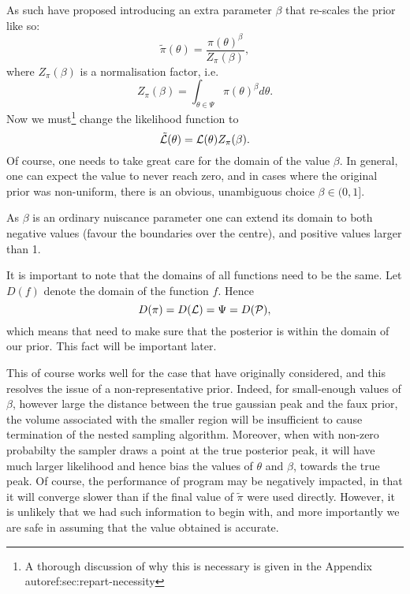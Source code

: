 \documentclass[usenatbib]{mnras}
\begin{document}
As such \citeauthor{chen-ferroz-hobson} have proposed introducing an
extra parameter \(\beta\) that re-scales the prior like so:
\begin{equation}
  \tilde{\pi}(\theta) = \frac{\pi(\theta)^{\beta}}{Z_{\pi}(\beta)},
\end{equation}
where \(Z_\pi(\beta)\) is a normalisation factor, i.e. 
\begin{equation}
  Z_{\pi}(\beta) = \int_{\theta \in \Psi} \pi(\theta)^{\beta}d\theta.
\end{equation}
Now we must\footnote{A thorough discussion of why this is necessary is given in the Appendix autoref:sec:repart-necessity} change the likelihood function to 
\begin{equation}
  \tilde{\cal L}(\theta) = {\cal L}(\theta) Z_{\pi}(\beta).
\end{equation}
Of course, one needs to take great care for the domain of the value
\(\beta\). In general, one can expect the value to never reach
zero, and in cases where the original prior was non-uniform, there
is an obvious, unambiguous choice \(\beta \in (0, 1]\). 

As \(\beta\) is an ordinary nuiscance parameter one can extend its
domain to both negative values (favour the boundaries over the
centre), and positive values larger than 1.

It is important to note that the domains of all functions need to
be the same. Let \(D(f)\) denote the domain of the function
\(f\). Hence 
\begin{equation}
  D(\pi) = D({\cal L}) = \Psi = D({\cal P}),
\end{equation} 
which means that need to make sure that the posterior is within the
domain of our prior. This fact will be important later.\label{domain-discussion}

This of course works well for the case that
\citeauthor{chen-ferroz-hobson} have originally considered, and this
resolves the issue of a non-representative prior. Indeed, for
small-enough values of \(\beta\), however large the distance
between the true gaussian peak and the faux prior, the volume
associated with the smaller region will be insufficient to cause
termination of the nested sampling algorithm. Moreover, when with
non-zero probabilty the sampler draws a point at the true posterior
peak, it will have much larger likelihood and hence bias the values
of \(\theta\) and \(\beta\), towards the true peak. Of course, the
performance of program may be negatively impacted, in that it will
converge slower than if the final value of \(\tilde{\pi}\) were
used directly. However, it is unlikely that we had such information
to begin with, and more importantly we are safe in assuming that
the value obtained is accurate.
\end{document}
